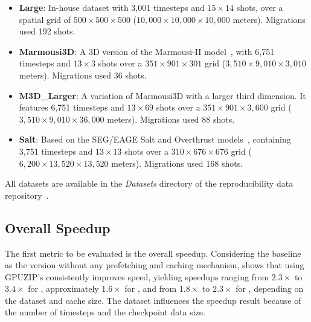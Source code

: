 \documentclass[Ingles]{ic-tese-v3}
\begin{document}
\begin{itemize}
    \item \textbf{Large}: In-house dataset with 3,001 timesteps and $15 \times 14$ shots, over a spatial grid of $500 \times 500 \times 500$ ($10,000 \times 10,000 \times 10,000$ meters). Migrations used 192 shots.
    
    \item \textbf{Marmousi3D}: A 3D version of the Marmousi-II model~\cite{marmousi2}, with 6,751 timesteps and $13 \times 3$ shots over a $351 \times 901 \times 301$ grid ($3,510 \times 9,010 \times 3,010$ meters). Migrations used 36 shots.
    
    \item \textbf{M3D\_Larger}: A variation of Marmousi3D with a larger third dimension. It features 6,751 timesteps and $13 \times 69$ shots over a $351 \times 901 \times 3,600$ grid ($3,510 \times 9,010 \times 36,000$ meters). Migrations used 88 shots.
    
    \item \textbf{Salt}: Based on the SEG/EAGE Salt and Overthrust models~\cite{salt}, containing 3,751 timesteps and $13 \times 13$ shots over a $310 \times 676 \times 676$ grid ($6,200 \times 13,520 \times 13,520$ meters). Migrations used 168 shots.
\end{itemize}

All datasets are available in the \textit{Datasets} directory of the reproducibility data repository~\cite{ds}.

\subsection{Overall Speedup}
The first metric to be evaluated is the overall speedup. Considering the baseline as the version without any prefetching and caching mechanism,  shows that using GPUZIP's \checkpointprefetching consistently improves speed, yielding speedups ranging from $2.3\times$ to $3.4\times$ for \revolve, approximately $1.6\times$ for \zcut, and from $1.8\times$ to $2.3\times$ for \uniform, depending on the dataset and cache size. The dataset influences the speedup result because of the number of timesteps and the checkpoint data size.
\end{document}
